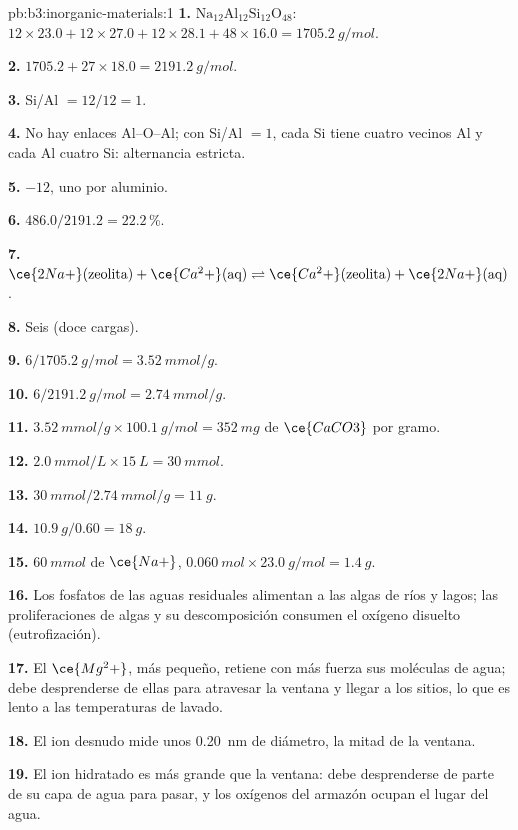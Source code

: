 \begin{solution}{pb:b3:inorganic-materials:1}
\textbf{1.} $\mathrm{Na_{12}Al_{12}Si_{12}O_{48}}$: $12 \times 23.0 + 12 \times 27.0 + 12 \times 28.1 + 48 \times 16.0 = \qty{1705.2}{g/mol}$.

\textbf{2.} $1705.2 + 27 \times 18.0 = \qty{2191.2}{g/mol}$.

\textbf{3.} Si/Al $= 12/12 = 1$.

\textbf{4.} No hay enlaces Al--O--Al; con Si/Al $= 1$, cada Si tiene cuatro vecinos Al y cada
Al cuatro Si: alternancia estricta.

\textbf{5.} $-12$, uno por aluminio.

\textbf{6.} $486.0/2191.2 = 22.2$\,\%.

\textbf{7.} $\ce{2Na+}(\text{zeolita}) + \ce{Ca^2+}(\text{aq}) \rightleftharpoons \ce{Ca^2+}(\text{zeolita}) + \ce{2Na+}(\text{aq})$.

\textbf{8.} Seis (doce cargas).

\textbf{9.} $6/\qty{1705.2}{g/mol} = \qty{3.52}{mmol/g}$.

\textbf{10.} $6/\qty{2191.2}{g/mol} = \qty{2.74}{mmol/g}$.

\textbf{11.} $\qty{3.52}{mmol/g} \times \qty{100.1}{g/mol} = \qty{352}{mg}$ de $\ce{CaCO3}$ por gramo.

\textbf{12.} $\qty{2.0}{mmol/L} \times \qty{15}{L} = \qty{30}{mmol}$.

\textbf{13.} $\qty{30}{mmol}/\qty{2.74}{mmol/g} = \qty{11}{g}$.

\textbf{14.} $\qty{10.9}{g}/0.60 = \qty{18}{g}$.

\textbf{15.} $\qty{60}{mmol}$ de $\ce{Na+}$, $\qty{0.060}{mol} \times \qty{23.0}{g/mol} = \qty{1.4}{g}$.

\textbf{16.} Los fosfatos de las aguas residuales alimentan a las algas de ríos y lagos; las proliferaciones
de algas y su descomposición consumen el oxígeno disuelto (eutrofización).

\textbf{17.} El $\ce{Mg^2+}$, más pequeño, retiene con más fuerza sus moléculas de agua; debe desprenderse de ellas
para atravesar la ventana y llegar a los sitios, lo que es lento a las temperaturas de lavado.

\textbf{18.} El ion desnudo mide unos \qty{0.20}{nm} de diámetro, la mitad de la ventana.

\textbf{19.} El ion hidratado es más grande que la ventana: debe desprenderse de parte de su
capa de agua para pasar, y los oxígenos del armazón ocupan el lugar del
agua.


\end{solution}
